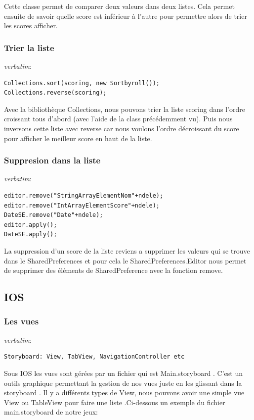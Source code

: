 \documentclass{article}
\begin{document}
Cette classe permet de comparer deux valeurs dans deux listes. Cela permet ensuite de savoir quelle score est inférieur à l'autre pour permettre alors de trier les scores afficher. 



\subsubsection{Trier la liste}
\textit{verbatim}:
\begin{verbatim}
Collections.sort(scoring, new Sortbyroll());
Collections.reverse(scoring);
\end{verbatim}

Avec la bibliothèque Collections, nous pouvons trier la liste scoring dans l'ordre croissant tous d'abord (avec l'aide de la class précédemment vu). Puis nous inversons cette liste avec reverse car nous voulons l'ordre décroissant du score pour afficher le meilleur score en haut de la liste.

\subsubsection{Suppresion dans la liste}
\textit{verbatim}:
\begin{verbatim}
editor.remove("StringArrayElementNom"+ndele);
editor.remove("IntArrayElementScore"+ndele);
DateSE.remove("Date"+ndele);
editor.apply();
DateSE.apply();
\end{verbatim}

La suppression d'un score de la liste reviens a supprimer les valeurs qui se trouve dans le SharedPreferences et pour cela le SharedPreferences.Editor nous permet de supprimer des éléments de SharedPreference avec la fonction remove.

\subsection{IOS}

\subsubsection{Les vues}
\textit{verbatim}:
\begin{verbatim}
Storyboard: View, TabView, NavigationController etc
\end{verbatim}

Sous IOS les vues sont gérées par un fichier qui est Main.storyboard . C'est un outils graphique permettant la gestion de nos vues juste en les glissant dans la storyboard . Il y a différents types de View, nous pouvons avoir une simple vue View ou TableView pour faire une liste .Ci-dessous un exemple du fichier main.storyboard de notre jeux:
\end{document}
